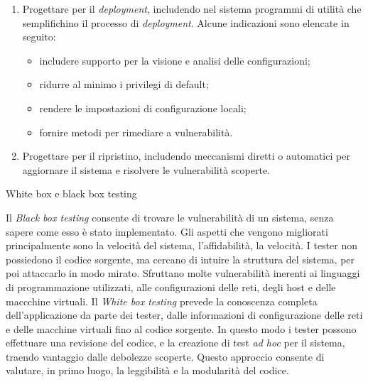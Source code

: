 \begin{solution}
\begin{enumerate}
	\item Progettare per il \textit{deployment}, includendo nel sistema programmi di utilità che semplifichino il processo di \textit{deployment}.
	\newline
	Alcune indicazioni sono elencate in seguito:
	\begin{itemize}
		\item includere supporto per la visione e analisi delle configurazioni;
		\item ridurre al minimo i privilegi di default;
		\item rendere le impostazioni di configurazione locali;
		\item fornire metodi per rimediare a vulnerabilità.
	\end{itemize}
	\item Progettare per il ripristino, includendo meccanismi diretti o automatici per aggiornare il sistema e risolvere le vulnerabilità scoperte.
\end{enumerate}
\end{solution}

\begin{problem}{2.8}
White box e black box testing
\end{problem}
\begin{solution}
Il \textit{Black box testing} consente di trovare le vulnerabilità di un sistema, senza sapere come esso è stato implementato.
Gli aspetti che vengono migliorati principalmente sono la velocità del sistema, l'affidabilità, la velocità.
I tester non possiedono il codice sorgente, ma cercano di intuire la struttura del sistema, per poi attaccarlo in modo mirato.
\newline
Sfruttano molte vulnerabilità inerenti ai linguaggi di programmazione utilizzati, alle configurazioni delle reti, degli host e delle maccchine virtuali.
\newline
Il \textit{White box testing} prevede la conoscenza completa dell'applicazione da parte dei tester, dalle informazioni di configurazione delle reti e delle macchine virtuali fino al codice sorgente.
In questo modo i tester possono effettuare una revisione del codice, e la creazione di test \textit{ad hoc} per il sistema, traendo vantaggio dalle debolezze scoperte.
Questo approccio consente di valutare, in primo luogo, la leggibilità e la modularità del codice.
\end{solution}

